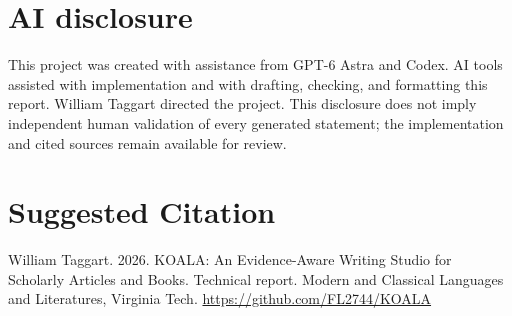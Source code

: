 \documentclass[manuscript,screen,nonacm]{acmart}
\begin{document}
\FloatBarrier
\section{AI disclosure}

This project was created with assistance from GPT-6 Astra and Codex. AI tools assisted with implementation and with drafting, checking, and formatting this report. William Taggart directed the project. This disclosure does not imply independent human validation of every generated statement; the implementation and cited sources remain available for review.




\section*{Suggested Citation}
William Taggart. 2026. KOALA: An Evidence-Aware Writing Studio for Scholarly Articles and Books. Technical report. Modern and Classical Languages and Literatures, Virginia Tech.
\url{https://github.com/FL2744/KOALA}
\end{document}
